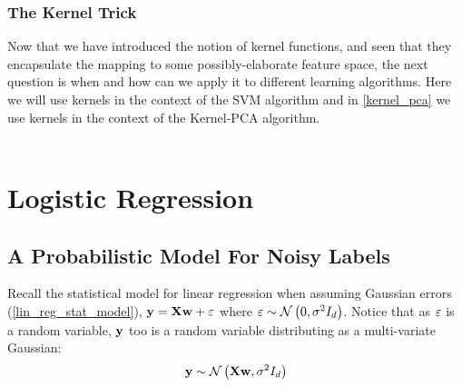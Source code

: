 \subsubsection{The Kernel Trick}
Now that we have introduced the notion of kernel functions, and seen that they encapsulate the mapping to some possibly-elaborate feature space, the next question is when and how can we apply it to different learning algorithms. Here we will use kernels in the context of the SVM algorithm and in \ref{kernel_pca} we use kernels in the context of the Kernel-PCA algorithm.
~\\
\\


\section{Logistic Regression}
\subsection{A Probabilistic Model For Noisy Labels}
Recall the statistical model for linear regression when assuming Gaussian errors (\ref{lin_reg_stat_model}), $\mathbf{y}=\mathbf{X}\mathbf{w}+\varepsilon$ where $\varepsilon\sim\mathcal{N}\left(0,\sigma^2I_d\right) $. Notice that as $\varepsilon$ is a random variable, $\mathbf{y}$ too is a random variable distributing as a multi-variate Gaussian:
$$ \mathbf{y}\sim\mathcal{N}\left(\mathbf{X}\mathbf{w},\sigma^2I_d\right) $$

